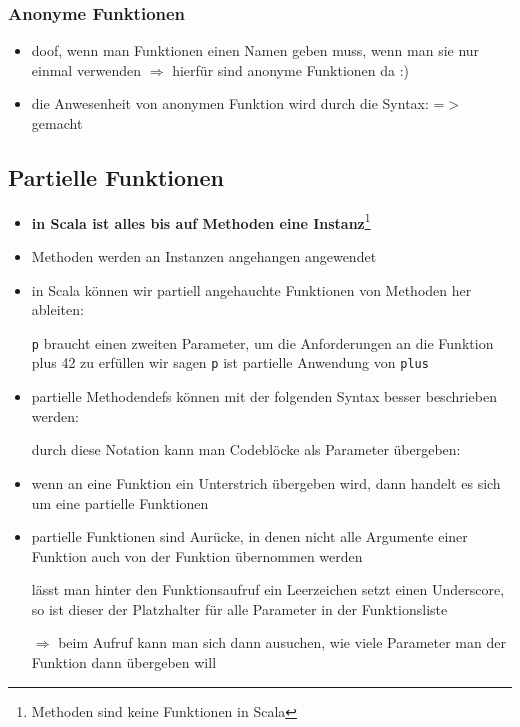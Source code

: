   


\subsubsection{Anonyme Funktionen}
\begin{itemize}
  \item doof, wenn man Funktionen einen Namen geben muss, wenn man sie
  nur einmal verwenden $\Rightarrow$ hierfür sind anonyme Funktionen da :)
  \item die Anwesenheit von anonymen Funktion wird durch die Syntax:
  \textsc{=$>$} gemacht
  
  
\end{itemize}


\subsection{Partielle Funktionen}
\begin{itemize}
  \item \textbf{in Scala ist alles bis auf Methoden eine 
  Instanz}\footnote{Methoden sind keine Funktionen in Scala}
  \item Methoden werden an Instanzen angehangen \und angewendet
  \item in Scala können wir partiell angehauchte Funktionen von Methoden
  her ableiten:
  
  
  
  \texttt{p} braucht einen zweiten Parameter, um die Anforderungen an
  die Funktion plus 42 zu erfüllen \und wir sagen \texttt{p} ist
  partielle Anwendung von \texttt{plus}
  
  \item partielle Methodendefs können mit der folgenden Syntax besser
  beschrieben werden:
  
  
  
  
  durch diese Notation kann man Codeblöcke als Parameter übergeben:
  
  
  
    \item wenn an eine Funktion ein Unterstrich übergeben wird, dann handelt
  es sich um eine partielle Funktionen
  \item partielle Funktionen sind Aurücke, in denen nicht alle Argumente 
  einer Funktion auch von der Funktion übernommen werden
  
  
  
  lässt man hinter den Funktionsaufruf ein Leerzeichen
  \und setzt einen Underscore, so ist dieser der Platzhalter
  für alle Parameter in der Funktionsliste
  
  $\Rightarrow$ beim Aufruf kann man sich dann ausuchen,
  wie viele Parameter man der Funktion dann übergeben
  will
\end{itemize}


